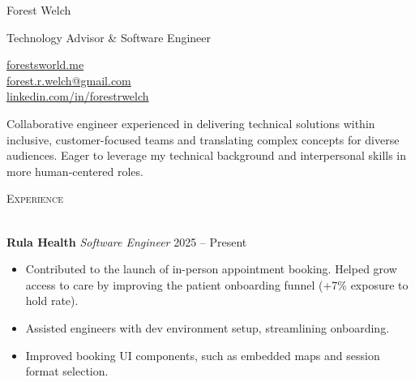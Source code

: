 \documentclass[a4paper]{article}
\renewcommand{\small}{\fontsize{9.5}{12}\selectfont\itshape}
\newcommand{\header}[1]{
    {\hspace*{-18pt}\vspace*{3pt} \textcolor{primary}{\textsc{#1}}}
    \vspace*{-12pt} \\
    \hspace*{-18pt} \textcolor{primary}{\hrulefill} \\
}
\begin{document}
\begin{multicols}{2}
\columnbreak

\begin{minipage}{\textwidth}
    {\fontsize{36}{36}\selectfont\textcolor{primary}{Forest Welch}}
    \hspace{0.3cm}
\end{minipage}

{\fontsize{12}{12}\selectfont\textcolor{secondary}{Technology Advisor \& Software Engineer}}
\columnbreak

\vspace{12mm} %
\hspace*{30mm} %
\begin{minipage}[t]{0.4\textwidth}
\raggedright
\vspace{2mm}
\href{https://forestsworld.me/}{forestsworld.me}\\
\href{mailto:forest.r.welch@gmail.com}{forest.r.welch@gmail.com}\\
\href{https://linkedin.com/in/forestrwelch}{linkedin.com/in/forestrwelch}
\end{minipage}
\end{multicols}

Collaborative engineer experienced in delivering technical solutions within inclusive, customer-focused teams and translating complex concepts for diverse audiences. Eager to leverage my technical background and interpersonal skills in more human-centered roles.
\vspace{4mm}

\header{Experience}
\vspace{1mm}

\textbf{Rula Health} \textcolor{tertiary}{{\small{Software Engineer}}} \hfill \textcolor{tertiary}{2025 – Present}\\
\vspace{-2mm}
\begin{itemize} \itemsep .5pt
    \item Contributed to the launch of in-person appointment booking. Helped grow access to care by improving the patient onboarding funnel (+7\% exposure to hold rate).
    \item Assisted engineers with dev environment setup, streamlining onboarding.
    \item Improved booking UI components, such as embedded maps and session format selection.
\end{itemize}
\end{document}
